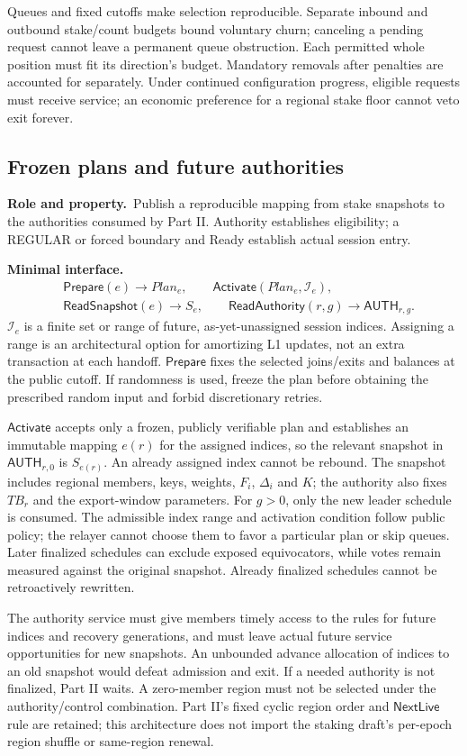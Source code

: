 \documentclass[11pt,a4paper]{article}
\newcommand{\api}[1]{\ensuremath{\mathsf{#1}}}
\newcommand{\TB}{\mathit{TB}}
\newcommand{\role}{\textbf{Role and property.}\ }
\newcommand{\iface}{\textbf{Minimal interface.}\ }
\begin{document}
Queues and fixed cutoffs make selection reproducible. Separate inbound
and outbound stake/count budgets bound voluntary churn; canceling a
pending request cannot leave a permanent queue obstruction. Each permitted
whole position must fit its direction's budget. Mandatory removals after
penalties are accounted for separately. Under continued configuration
progress, eligible requests must receive service; an economic preference
for a regional stake floor cannot veto exit forever.

\subsection{Frozen plans and future authorities}\label{sec:authority}
\role Publish a reproducible mapping from stake snapshots to the
authorities consumed by Part II. Authority establishes eligibility;
a REGULAR or forced boundary and Ready establish actual session entry.

\iface
\[
\begin{aligned}
 &\api{Prepare}(e)\to\mathit{Plan}_e,\qquad
   \api{Activate}(\mathit{Plan}_e,\mathcal I_e),\\
 &\api{ReadSnapshot}(e)\to S_e,\qquad
   \api{ReadAuthority}(r,g)\to\api{AUTH}_{r,g}.
\end{aligned}
\]
$\mathcal I_e$ is a finite set or range of future, as-yet-unassigned
session indices. Assigning a range is an architectural option for
amortizing L1 updates, not an extra transaction at each handoff.
\api{Prepare} fixes the selected joins/exits and balances at the public
cutoff. If randomness is used, freeze the plan before obtaining the
prescribed random input and forbid discretionary retries.

\api{Activate} accepts only a frozen, publicly verifiable plan and
establishes an immutable mapping $e(r)$ for the assigned indices, so
the relevant snapshot in $\api{AUTH}_{r,0}$ is $S_{e(r)}$.
An already assigned index cannot be rebound. The snapshot includes
regional members, keys, weights, $F_i$, $\Delta_i$ and $K$; the authority
also fixes $\TB_r$ and the export-window parameters. For $g>0$, only
the new leader schedule is consumed.
The admissible index range and activation condition follow public policy;
the relayer cannot choose them to favor a particular plan or skip queues.
Later finalized schedules can exclude exposed equivocators, while votes
remain measured against the original snapshot. Already finalized
schedules cannot be retroactively rewritten.

The authority service must give members timely access to the rules for
future indices and recovery generations, and must leave actual future
service opportunities for new snapshots. An unbounded advance allocation
of indices to an old snapshot would defeat admission and exit. If a needed
authority is not finalized, Part II waits. A zero-member region must not
be selected under the authority/control combination. Part II's
fixed cyclic region order and \api{NextLive} rule are retained; this
architecture does not import the staking draft's per-epoch region shuffle
or same-region renewal.
\end{document}
